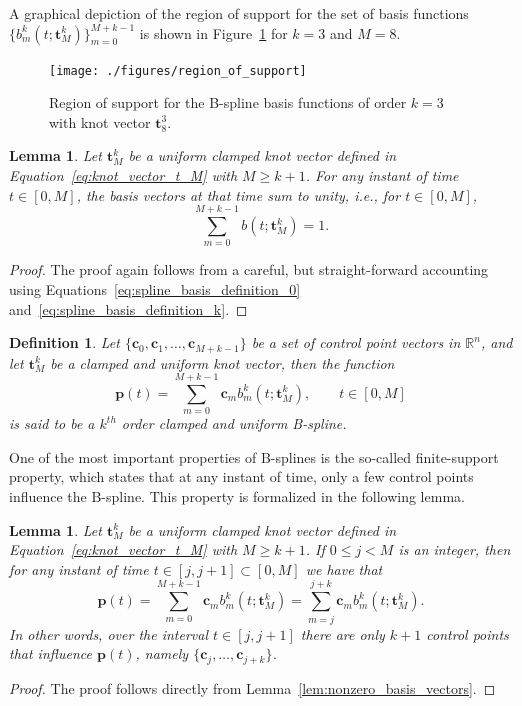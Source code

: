 \documentclass{article}
\newtheorem{lemma}[theorem]{Lemma}
\newtheorem{definition}[theorem]{Definition}
\newcommand{\cbf}{\mathbf{c}}
\begin{document}
A graphical depiction of the region of support for the set of basis functions $\{b_m^k(t;\mathbf{t}_M^k)\}_{m=0}^{M+k-1}$ is shown in Figure~\ref{fig:region_of_support} for $k=3$ and $M=8$.
\begin{figure}[hbt]
  \centering\texttt{[image: ./figures/region\_of\_support]}
  \caption{Region of support for the B-spline basis functions of order $k=3$ with knot vector $\mathbf{t}_8^3$.}
  \label{fig:region_of_support}  
\end{figure}

\begin{lemma} \label{lem:basis_vectors_sum_to_1}
	Let $\mathbf{t}_M^k$ be a uniform clamped knot vector defined in Equation~\eqref{eq:knot_vector_t_M} with $M\geq k+1$. For any instant of time $t\in[0,M]$, the basis vectors at that time sum to unity, i.e., for $t\in[0, M]$,
	\[
	\sum_{m=0}^{M+k-1} b(t; \mathbf{t}_M^k) = 1.
	\]
\end{lemma}
\begin{proof}  The proof again follows from a careful, but straight-forward accounting using Equations~\eqref{eq:spline_basis_definition_0} and~\eqref{eq:spline_basis_definition_k}.	
\end{proof}

\begin{definition}
Let $\{\cbf_0, \cbf_1, \dots, \cbf_{M+k-1}\}$ be a set of control point vectors in $\mathbb{R}^n$, and let $\mathbf{t}_M^k$ be a clamped and uniform knot vector, then the function 
\begin{equation}\label{eq:clamped_uniform_spline}
\mathbf{p}(t) = \sum_{m=0}^{M+k-1} \cbf_m b_m^k(t; \mathbf{t}_M^k), \qquad t\in[0, M]
\end{equation}
is said to be a $k^{th}$ order clamped and uniform B-spline. 
\end{definition}

One of the most important properties of B-splines is the so-called finite-support property, which states that at any instant of time, only a few control points influence the B-spline.  This property is formalized in the following lemma.
\begin{lemma}\label{lem:finite_num_control_points}
	Let $\mathbf{t}_M^k$ be a uniform clamped knot vector defined in Equation~\eqref{eq:knot_vector_t_M} with $M\geq k+1$. If $0\leq j < M$ is an integer, then for any instant of time $t\in[j, j+1]\subset [0, M]$ we have that
	\[
	\mathbf{p}(t) = \sum_{m=0}^{M+k-1} \cbf_m b_m^k(t; \mathbf{t}_M^k) = \sum_{m=j}^{j+k} \cbf_m b_m^k(t; \mathbf{t}_M^k).
	\]
	In other words, over the interval $t\in[j, j+1]$ there are only $k+1$ control points that influence $\mathbf{p}(t)$, namely
	$\{\cbf_j, \dots, \cbf_{j+k}\}$.
\end{lemma}
\begin{proof}
The proof follows directly from Lemma~\ref{lem:nonzero_basis_vectors}.	
\end{proof}
\end{document}
